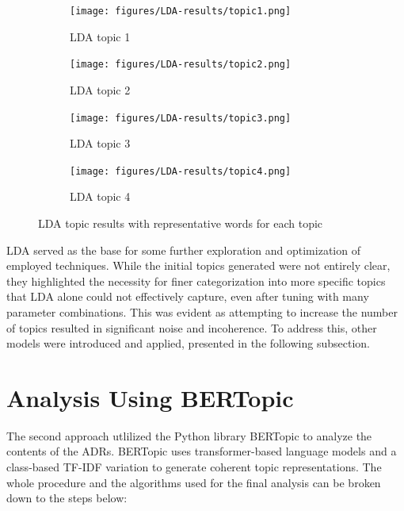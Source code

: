         \begin{figure}[hbt!]
            \begin{subfigure}{.475\linewidth}
              \texttt{[image: figures/LDA-results/topic1.png]}
              \caption{LDA topic 1}
              \label{MLEDdet}
            \end{subfigure}\hfill %
            \begin{subfigure}{.475\linewidth}
              \texttt{[image: figures/LDA-results/topic2.png]}
              \caption{LDA topic 2}
              \label{energydetPSK}
            \end{subfigure}
            \medskip %
            \begin{subfigure}{.475\linewidth}
              \texttt{[image: figures/LDA-results/topic3.png]}
              \caption{LDA topic 3}
              \label{velcomp}
            \end{subfigure}\hfill %
            \begin{subfigure}{.475\linewidth}
              \texttt{[image: figures/LDA-results/topic4.png]}
              \caption{LDA topic 4}
              \label{estcomp}
            \end{subfigure}
            \caption{LDA topic results with representative words for each topic}
            \label{fig:LDA_results}
        \end{figure}

        LDA served as the base for some further exploration and optimization of employed techniques. While the initial topics generated were not entirely clear, they highlighted the necessity for finer categorization into more specific topics that LDA alone could not effectively capture, even after tuning with many parameter combinations. This was evident as attempting to increase the number of topics resulted in significant noise and incoherence. To address this, other models were introduced and applied, presented in the following subsection.

    \section{Analysis Using BERTopic}
        The second approach utlilized the Python library BERTopic \cite{bertTopic} to analyze the contents of the ADRs. BERTopic uses transformer-based language models and a class-based TF-IDF variation to generate coherent topic representations. The whole procedure and the algorithms used for the final analysis can be broken down to the steps below:

